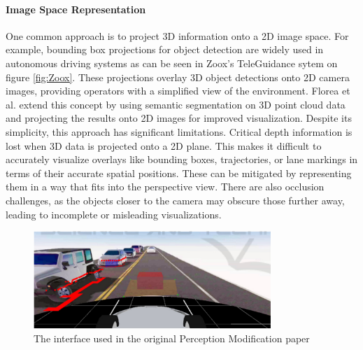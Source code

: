 \paragraph{Image Space Representation} One common approach is to project 3D information onto a
2D image space. For example, bounding box projections for object detection are
widely used in autonomous driving systems as can be seen in Zoox's TeleGuidance sytem
on figure \ref{fig:Zoox}. These projections overlay 3D object
detections onto 2D camera images, providing operators with a simplified view of
the environment. Florea et al. \cite{Florea} extend this concept by using semantic segmentation on
3D point cloud data and projecting the results onto 2D images for improved
visualization. Despite its simplicity, this approach has significant limitations.
Critical depth information is lost when 3D data is projected onto a 2D plane. This makes
it difficult to accurately visualize overlays like bounding boxes, trajectories, or
lane markings in terms of their accurate spatial positions. These can be mitigated by
representing them in a way that fits into the perspective view. There are also occlusion
challenges, as the objects closer to the camera may obscure those further away, leading
to incomplete or misleading visualizations.

\begin{figure}
    \includegraphics[width=0.8\textwidth]{figures/perceptionMod.png}
    \centering
    \caption{The interface used in the original Perception Modification paper \cite{feiler2023perception}}
    \label{fig:PerceptionMod}
\end{figure}
